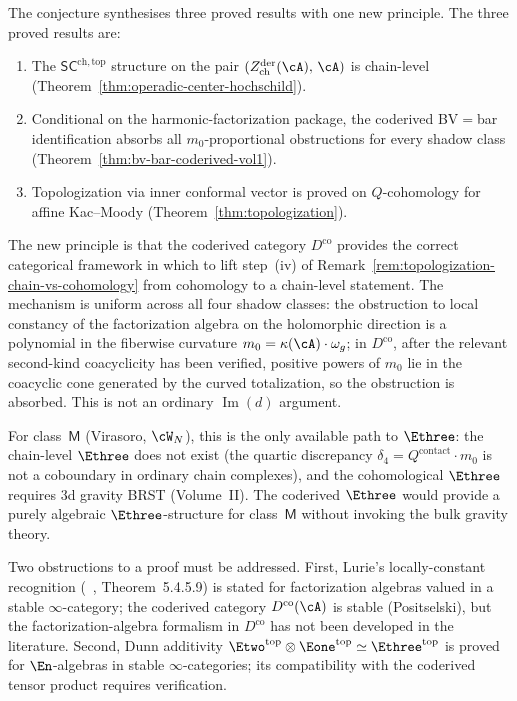 \begin{remark}
\label{rem:coderived-e3-structure}%
%
The conjecture synthesises three proved results with one new
principle.
The three proved results are:
\begin{enumerate}[label=\textup{(\alph*)}]
\item The $\mathsf{SC}^{\mathrm{ch,top}}$ structure on the
 pair $(Z^{\mathrm{der}}_{\mathrm{ch}}(\cA),\, \cA)$ is
 chain-level
 (Theorem~\ref{thm:operadic-center-hochschild}).
\item Conditional on the harmonic-factorization package, the coderived
 BV$=$bar identification absorbs all $m_0$-proportional obstructions
 for every shadow class
 (Theorem~\ref{thm:bv-bar-coderived-vol1}).
\item Topologization via inner conformal vector is proved on
 $Q$-cohomology for affine Kac--Moody
 (Theorem~\ref{thm:topologization}).
\end{enumerate}
The new principle is that the coderived category $D^{\mathrm{co}}$
provides the correct categorical framework in which to lift
step~(iv) of
Remark~\ref{rem:topologization-chain-vs-cohomology} from
cohomology to a chain-level statement. The mechanism is uniform
across all four shadow classes: the obstruction to local constancy
of the factorization algebra on the holomorphic direction is a
polynomial in the fiberwise curvature $m_0 = \kappa(\cA) \cdot
\omega_g$; in $D^{\mathrm{co}}$, after the relevant second-kind
coacyclicity has been verified, positive powers of $m_0$ lie in the
coacyclic cone generated by the curved totalization, so the
obstruction is absorbed. This is not an ordinary
$\operatorname{Im}(d)$ argument.

For class~$\mathsf{M}$ (Virasoro, $\cW_N$), this is the only
available path to $\Ethree$: the chain-level $\Ethree$ does not
exist (the quartic discrepancy $\delta_4 = Q^{\mathrm{contact}}
\cdot m_0$ is not a coboundary in ordinary chain complexes),
and the cohomological $\Ethree$ requires $3$d gravity BRST
(Volume~II). The coderived $\Ethree$ would provide a purely
algebraic $\Ethree$-structure for class~$\mathsf{M}$ without
invoking the bulk gravity theory.

Two obstructions to a proof must be addressed.
First, Lurie's locally-constant recognition
(~\cite{HA}, Theorem~5.4.5.9) is stated for
factorization algebras valued in a stable $\infty$-category;
the coderived category $D^{\mathrm{co}}(\cA)$ is stable
(Positselski), but the factorization-algebra formalism in
$D^{\mathrm{co}}$ has not been developed in the literature.
Second, Dunn additivity
$\Etwo^{\mathrm{top}} \otimes \Eone^{\mathrm{top}} \simeq
\Ethree^{\mathrm{top}}$ is proved for $\En$-algebras in
stable $\infty$-categories; its compatibility with the
coderived tensor product requires verification.
\end{remark}

